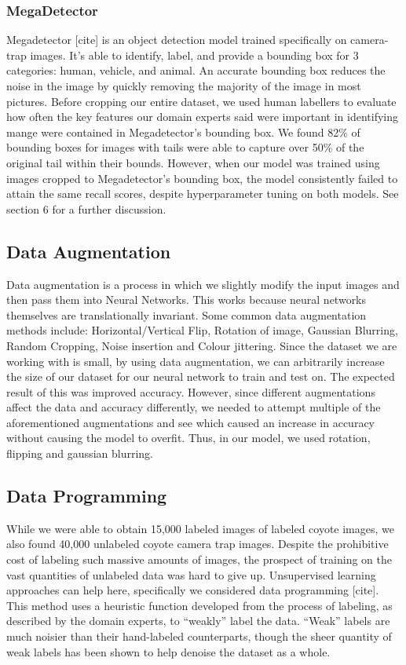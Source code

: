 \documentclass{article}
\begin{document}

\subsubsection{MegaDetector}
Megadetector [cite] is an object detection model trained specifically on camera-trap images. It’s able to identify, label, and provide a bounding box for 3 categories: human, vehicle, and animal. An accurate bounding box reduces the noise in the image by quickly removing the majority of the image in most pictures. Before cropping our entire dataset, we used human labellers to evaluate how often the key features our domain experts said were important in identifying mange were contained in Megadetector’s bounding box. We found 82\% of bounding boxes for images with tails were able to capture over 50\% of the original tail within their bounds. However, when our model was trained using images cropped to Megadetector’s bounding box, the model consistently failed to attain the same recall scores, despite hyperparameter tuning on both models. See section 6 for a further discussion.
\subsection{Data Augmentation}
Data augmentation is a process in which we slightly modify the input images and then pass them into Neural Networks. This works because neural networks themselves are translationally invariant. Some common data augmentation methods include: Horizontal/Vertical Flip, Rotation of image, Gaussian Blurring, Random Cropping, Noise insertion and Colour jittering. Since the dataset we are working with is small, by using data augmentation, we can arbitrarily increase the size of our dataset for our neural network to train and test on. The expected result of this was improved accuracy. However, since different augmentations affect the data and accuracy differently, we needed to attempt multiple of the aforementioned augmentations and see which caused an increase in accuracy without causing the model to overfit. Thus, in our model, we used rotation, flipping and gaussian blurring.
\subsection{Data Programming}
While we were able to obtain 15,000 labeled images of labeled coyote images, we also found 40,000 unlabeled coyote camera trap images. Despite the prohibitive cost of labeling such massive amounts of images, the prospect of training on the vast quantities of unlabeled data was hard to give up. Unsupervised learning approaches can help here, specifically we considered data programming [cite]. This method uses a heuristic function developed from the process of labeling, as described by the domain experts, to “weakly” label the data. “Weak” labels are much noisier than their hand-labeled counterparts, though the sheer quantity of weak labels has been shown to help denoise the dataset as a whole.
\end{document}

